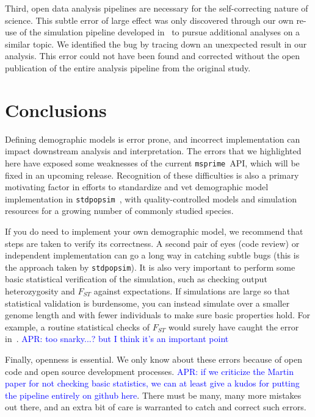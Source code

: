 \documentclass{article}
\newcommand{\msprime}[0]{\texttt{msprime}}
\newcommand{\stdpopsim}[0]{\texttt{stdpopsim}}
\newcommand{\aprcomment}[1]{{\textcolor{blue}{APR: #1}}}
\begin{document}
Third, open data analysis pipelines are necessary for the self-correcting nature of science. 
This subtle error of large effect was only discovered through our own re-use of
the simulation pipeline developed in~\citep{martin2017human} to pursue 
additional analyses on a similar topic. We identified the bug by tracing down an unexpected 
result in our analysis. This error could not have been found and corrected without the open
publication of the entire analysis pipeline from the original study.

\section{Conclusions}

Defining demographic models is error prone, and incorrect implementation can  
impact downstream analysis and interpretation. The errors that we highlighted here have 
exposed some weaknesses of the current \msprime\ API, which will be fixed in an 
upcoming release. Recognition of these difficulties is also a 
primary motivating factor in efforts to standardize and vet demographic model 
implementation in \stdpopsim~\cite{adrion2019community}, with quality-controlled 
models and simulation resources for a growing number of commonly studied species.

If you do need to implement your own demographic model, we recommend that steps are taken to 
verify its correctness. A second pair of eyes (code review) or independent implementation 
can go a long way in catching subtle bugs (this is the approach taken by \stdpopsim). It is also 
very important to perform some basic statistical verification of the simulation, such as checking 
output heterozygosity and $F_{ST}$ against expectations. If simulations are large so that 
statistical validation is burdensome, you can instead simulate over a smaller genome length 
and with fewer individuals to make sure basic properties hold. For example, a routine statistical 
checks of $F_{ST}$ would surely have caught the error in~\citet{martin2017human}. 
\aprcomment{too snarky...? but I think it's an important point}

Finally, openness is essential. We only know about these errors because of open code and 
open source development processes. \aprcomment{if we criticize the Martin paper for not
checking basic statistics, we can at least give a kudos for putting the pipeline entirely on
github here}. There must be many, many more mistakes out there, and an extra bit of care 
is warranted to catch and correct such errors. 
\end{document}
